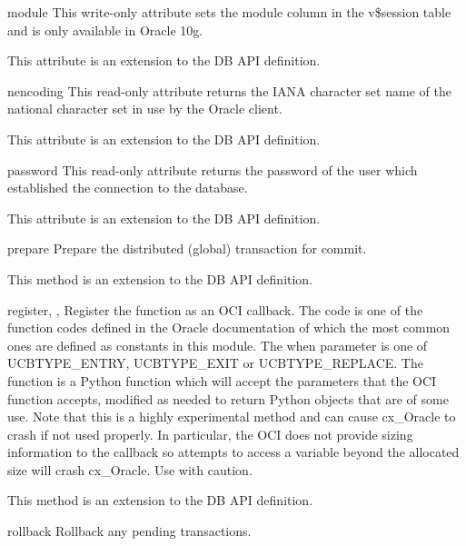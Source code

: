 \documentclass{manual}
\begin{document}
\begin{datadesc}{module}
  This write-only attribute sets the module column in the v\$session table and
  is only available in Oracle 10g.

   This attribute is an extension to the DB API definition.
\end{datadesc}

\begin{datadesc}{nencoding}
  This read-only attribute returns the IANA character set name of the national
  character set in use by the Oracle client.

   This attribute is an extension to the DB API definition.
\end{datadesc}

\begin{datadesc}{password}
  This read-only attribute returns the password of the user which established
  the connection to the database.

   This attribute is an extension to the DB API definition.
\end{datadesc}

\begin{funcdesc}{prepare}{}
  Prepare the distributed (global) transaction for commit.

   This method is an extension to the DB API definition.
\end{funcdesc}

\begin{funcdesc}{register}{, , }
  Register the function as an OCI callback. The code is one of the function
  codes defined in the Oracle documentation of which the most common ones are
  defined as constants in this module. The when parameter is one of
  UCBTYPE_ENTRY, UCBTYPE_EXIT or UCBTYPE_REPLACE. The function is a Python
  function which will accept the parameters that the OCI function accepts,
  modified as needed to return Python objects that are of some use. Note that
  this is a highly experimental method and can cause cx_Oracle to crash if not
  used properly. In particular, the OCI does not provide sizing information to
  the callback so attempts to access a variable beyond the allocated size will
  crash cx_Oracle. Use with caution.

   This method is an extension to the DB API definition.
\end{funcdesc}

\begin{funcdesc}{rollback}{}
  Rollback any pending transactions.
\end{funcdesc}
\end{document}
